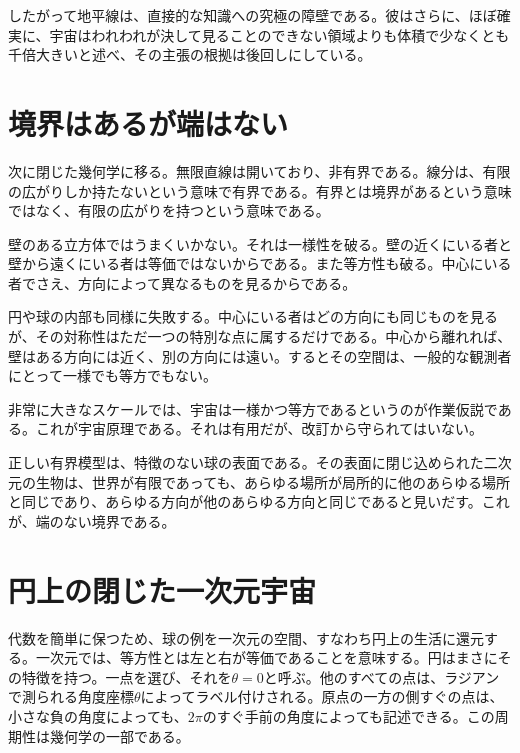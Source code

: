 したがって地平線は、直接的な知識への究極の障壁である。彼はさらに、ほぼ確実に、宇宙はわれわれが決して見ることのできない領域よりも体積で少なくとも千倍大きいと述べ、その主張の根拠は後回しにしている。

\section{境界はあるが端はない}

次に閉じた幾何学に移る。無限直線は開いており、非有界である。線分は、有限の広がりしか持たないという意味で有界である。有界とは境界があるという意味ではなく、有限の広がりを持つという意味である。

壁のある立方体ではうまくいかない。それは一様性を破る。壁の近くにいる者と壁から遠くにいる者は等価ではないからである。また等方性も破る。中心にいる者でさえ、方向によって異なるものを見るからである。

円や球の内部も同様に失敗する。中心にいる者はどの方向にも同じものを見るが、その対称性はただ一つの特別な点に属するだけである。中心から離れれば、壁はある方向には近く、別の方向には遠い。するとその空間は、一般的な観測者にとって一様でも等方でもない。

非常に大きなスケールでは、宇宙は一様かつ等方であるというのが作業仮説である。これが宇宙原理である。それは有用だが、改訂から守られてはいない。

\begin{classroomqa}
\end{classroomqa}

正しい有界模型は、特徴のない球の表面である。その表面に閉じ込められた二次元の生物は、世界が有限であっても、あらゆる場所が局所的に他のあらゆる場所と同じであり、あらゆる方向が他のあらゆる方向と同じであると見いだす。これが、端のない境界である。

\section{円上の閉じた一次元宇宙}

代数を簡単に保つため、球の例を一次元の空間、すなわち円上の生活に還元する。一次元では、等方性とは左と右が等価であることを意味する。円はまさにその特徴を持つ。一点を選び、それを\(\theta=0\)と呼ぶ。他のすべての点は、ラジアンで測られる角度座標\(\theta\)によってラベル付けされる。原点の一方の側すぐの点は、小さな負の角度によっても、\(2\pi\)のすぐ手前の角度によっても記述できる。この周期性は幾何学の一部である。

